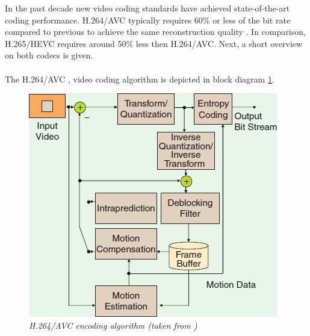 In the past decade new video coding standards have achieved state-of-the-art coding performance. H.264/AVC typically requires 60\% or less of the bit rate compared to previous  to achieve the same reconstruction quality \cite{H264_Overview}. In comparison, H.265/HEVC requires around 50\% less then H.264/AVC. Next, a short overview on both codecs is given.\\
\\
The H.264/AVC \cite{h264joint}, \cite{H264_Overview} video coding algorithm is depicted in block diagram \ref{h264}.

\begin{figure}[H]
\centerline{\includegraphics[scale=0.5]{pics/H264_Blockschaltbild}} %
\caption{\label{h264}{\it H.264/AVC encoding algorithm (taken from \cite{Paper1})}}
\end{figure} %

